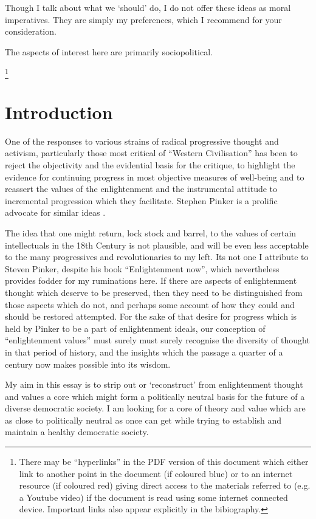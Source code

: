 \documentclass[10pt,titlepage]{article}
\begin{document}
Though I talk about what we `should' do, I do not offer these ideas as moral imperatives.
They are simply my preferences, which I recommend for your consideration.


The aspects of interest here are primarily sociopolitical.


\footnote{There may be ``hyperlinks'' in the PDF version of this document which either link to another point in the document  (if coloured blue) or to an internet resource  (if coloured red) giving direct access to the materials referred to (e.g. a Youtube video) if the document is read using some internet connected device.
Important links also appear explicitly in the bibiography.}

\section{Introduction}

One of the responses to various strains of radical progressive thought and activism, particularly those most critical of ``Western Civilisation'' has been to reject the objectivity and the evidential basis for the critique, to highlight the evidence for continuing progress in most objective measures of well-being and to reassert the values of the enlightenment and the instrumental attitude to incremental progression which they facilitate.
Stephen Pinker is a prolific advocate for similar ideas \cite{pinker-angels,pinker-en}.

The idea that one might return, lock stock and barrel, to the values of certain intellectuals in the 18th Century is not plausible, and will be even less acceptable to the many progressives and revolutionaries to my left.
Its not one I attribute to Steven Pinker, despite his book ``Enlightenment now''\cite{pinker-en}, which nevertheless provides fodder for my ruminations here.
If there are aspects of enlightenment thought which deserve to be preserved, then they need to be distinguished from those aspects which do not, and perhaps some account of how they could and should be restored attempted.
For the sake of that desire for progress which is held by Pinker to be a part of enlightenment ideals, our conception of ``enlightenment values'' must surely must surely recognise the diversity of thought in that period of history, and the insights which the passage a quarter of a century now makes possible into its wisdom.

My aim in this essay is to strip out or `reconstruct' from enlightenment thought and values a core which might form a politically neutral basis for the future of a diverse democratic society.
I am looking for a core of theory and value which are as close to politically neutral as once can get while trying to establish and maintain a healthy democratic society.
\end{document}
